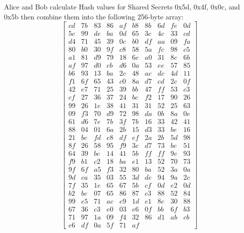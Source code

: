 \documentclass[journal]{IEEEtran}
\begin{document}
Alice and Bob calculate Hash values for Shared Secrets 0x5d, 0x4f, 0x0c, and 0x5b then combine them into the following 256-byte array:
$$
\begin{bmatrix}
cd & 7b & 83 & 86 & af & b8 & 8b & 6d & fe & 0d \\
5c & 99 & de & ba & 0d & 65 & 3c & 4c & 33 & cd \\
d4 & 71 & 45 & 39 & 0c & b0 & df & aa & 09 & fa \\
80 & b0 & 30 & 9f & c8 & 58 & 5a & fc & 98 & c5 \\
a1 & 81 & d9 & 79 & 18 & 6c & a0 & 31 & 8c & 6b \\
af & 97 & d0 & cb & d6 & 0a & 53 & ee & 57 & 85 \\
b6 & 93 & 13 & ba & 2c & 48 & ac & dc & 4d & 11 \\
f1 & 6f & 65 & 43 & c0 & 8a & d7 & cd & 2c & 0f \\
42 & e7 & 71 & 25 & 39 & bb & 47 & ff & 53 & c3 \\
cf & 27 & 36 & 37 & 24 & bc & f2 & 17 & 90 & 26 \\
99 & 26 & 1e & 38 & 41 & 31 & 31 & 52 & 25 & 63 \\
09 & f3 & 70 & d9 & 72 & 98 & da & 0b & 8a & 0e \\
61 & d6 & 7e & 7b & 3f & 7b & 16 & 33 & 42 & 41 \\
88 & 04 & 01 & 6a & 2b & 15 & d3 & 33 & be & 16 \\
21 & bc & fd & e8 & df & ef & 2a & 2b & 5d & 98 \\
8f & 26 & 58 & 95 & f9 & 3c & d7 & 73 & bc & 51 \\
64 & 39 & bc & 14 & 41 & 5b & ff & ff & 9c & 93 \\
f9 & b1 & c2 & 18 & ba & e1 & 13 & 52 & 70 & 73 \\
9f & 6f & a5 & f3 & 32 & 80 & ba & 52 & 3a & 0a \\
9d & ca & 35 & 03 & 55 & 3d & de & 94 & 9a & 2c \\
7f & 35 & 1e & 65 & 67 & 5b & cf & 0d & e2 & 0d \\
b2 & bc & 07 & 65 & 86 & 87 & c3 & 88 & 52 & 84 \\
99 & e5 & 71 & ac & e9 & 1d & e1 & 8c & 30 & 88 \\
67 & 36 & c3 & e0 & 03 & e6 & 0f & bb & 6f & b3 \\
71 & 97 & 1a & 09 & f4 & 32 & 86 & d1 & ab & cb \\
e6 & df & 0a & 5f & 71 & af
\end{bmatrix}
$$
\end{document}
